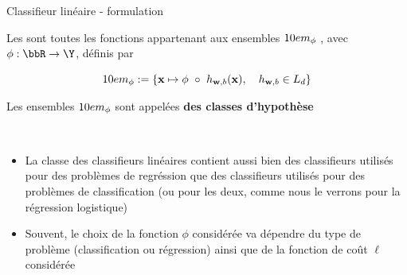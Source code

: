 \documentclass[10pt]{beamer}
\newcommand{\hsp}{\hspace*{1em}}
\begin{document}
\begin{frame}{Classifieur linéaire - formulation}
	

	
	
	\begin{vblock}{}
		Les  sont toutes les fonctions appartenant aux ensembles $10em_\phi$ , avec $\phi : \bbR \to \Y$,  définis par 
		
		$$\H_\phi := \left\{\mathbf{x}\mapsto \phi  \ \circ \ h_{\mathbf{w},b}  (\mathbf{x}), \hsp  h_{\mathbf{w},b} \in L_d\right\}$$
		\vspace*{-1.5em}
	\end{vblock}
	Les ensembles $10em_\phi$ sont appelées \textbf{des classes d'hypothèse}\\[2em]
	\pause

	 \\[.5em] 
\begin{itemize}
	\item La classe des classifieurs linéaires contient aussi bien des classifieurs  utilisés pour des problèmes de regréssion que des classifieurs utilisés pour des problèmes de classification (ou pour les deux, comme nous le verrons pour la régression logistique)\\[1em] 
	\item Souvent, le choix de la fonction $\phi$ considérée va dépendre du type de problème (classification ou régression) ainsi que de la fonction de coût $\ell$ considérée
\end{itemize}



\end{frame}
\end{document}
